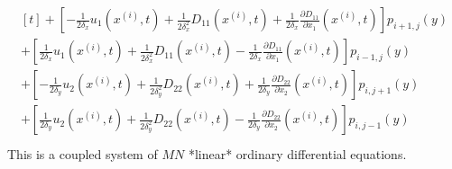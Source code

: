 \begin{align*}
\begin{multlined}[t]
		                                           + \left[-\frac{1}{2\delta_x}u_1\left(x^{(i)}, t\right) + \frac{1}{2\delta_x^2}D_{11}\left(x^{(i)}, t\right) + \frac{1}{2\delta_x}\frac{\partial D_{11}}{\partial x_1}\left(x^{(i)}, t\right)\right]p_{i+1,j}(y) \\
		                                           + \left[\frac{1}{2\delta_x}u_1\left(x^{(i)}, t\right) + \frac{1}{2\delta_x^2}D_{11}\left(x^{(i)}, t\right) - \frac{1}{2\delta_x}\frac{\partial D_{11}}{\partial x_1}\left(x^{(i)}, t\right)\right]p_{i-1,j}(y) \\
		                                           + \left[-\frac{1}{2\delta_y}u_2\left(x^{(i)}, t\right) + \frac{1}{2\delta_y^2}D_{22}\left(x^{(i)}, t\right) + \frac{1}{2\delta_y}\frac{\partial D_{22}}{\partial x_2}\left(x^{(i)}, t\right)\right]p_{i,j+1}(y) \\
		                                           + \left[\frac{1}{2\delta_y}u_2\left(x^{(i)}, t\right) + \frac{1}{2\delta_y^2}D_{22}\left(x^{(i)}, t\right) - \frac{1}{2\delta_y}\frac{\partial D_{22}}{\partial x_2}\left(x^{(i)}, t\right)\right]p_{i,j-1}(y) \\
	                                           \end{multlined}
\end{align*}
This is a coupled system of $MN$ *linear* ordinary differential equations.
